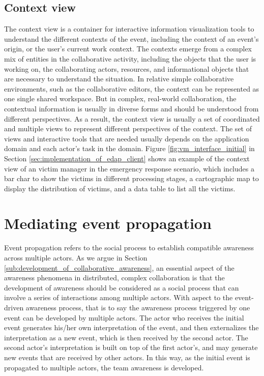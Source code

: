 \subsection{Context view} %
\label{sub:context_view}
The context view is a container for interactive information visualization tools to understand the different contexts of the event, including the context of an event's origin, or the user's current work context. The contexts emerge from a complex mix of entities in the collaborative activity, including the objects that the user is working on, the collaborating actors, resources, and informational objects that are necessary to understand the situation. In relative simple collaborative environments, such as the collaborative editors, the context can be represented as one single shared workspace. But in complex, real-world collaboration, the contextual information is usually in diverse forms and should be understood from different perspectives. As a result, the context view is usually a set of coordinated and multiple views to represent different perspectives of the context. The set of views and interactive tools that are needed usually depends on the application domain and each actor's task in the domain. Figure \ref{fig:vm_interface_initial} in Section \ref{sec:implementation_of_edap_client} shows an example of the context view of an victim manager in the emergency response scenario, which includes a bar char to show the victims in different processing stages, a cartographic map to display the distribution of victims, and a data table to list all the victims. 

\section{Mediating event propagation} %
\label{sec:mediating_event_propagation}
Event propagation refers to the social process to establish compatible awareness across multiple actors. As we argue in Section \ref{sub:development_of_collaborative_awareness}, an essential aspect of the awareness phenomena in distributed, complex collaboration is that the development of awareness should be considered as a social process that can involve a series of interactions among multiple actors. With aspect to the event-driven awareness process, that is to say the awareness process triggered by one event can be developed by multiple actors. The actor who receives the initial event generates his/her own interpretation of the event, and then externalizes the interpretation as a new event, which is then received by the second actor. The second actor's interpretation is built on top of the first actor's, and may generate new events that are received by other actors. In this way, as the initial event is propagated to multiple actors, the team awareness is developed.

